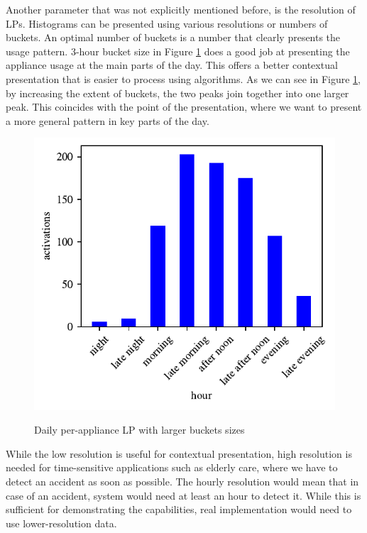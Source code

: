 Another parameter that was not explicitly mentioned before, is the resolution of LPs. 
Histograms can be presented using various resolutions or numbers of buckets.
An optimal number of buckets is a number that clearly presents the usage pattern. 
3-hour bucket size in Figure \ref{fig:4hours} does a good job at presenting the appliance usage at the main parts of the day.
This offers a better contextual presentation that is easier to process using algorithms.
As we can see in Figure \ref{fig:4hours}, by increasing the extent of buckets, the two peaks join together into one larger peak.
This coincides with the point of the presentation, where we want to present a more general pattern in key parts of the day.

\begin{figure}[H]
	\centering
	\caption{Daily per-appliance LP with larger buckets sizes}
	\includegraphics[]{../Figures/LPS/3_hours.pdf}
	\label{fig:4hours}
\end{figure}

While the low resolution is useful for contextual presentation,
high resolution is needed for time-sensitive applications such as elderly care,
where we have to detect an accident as soon as possible.
The hourly resolution would mean that in case of an accident, system would need at least an hour to detect it.
While this is sufficient for demonstrating the capabilities, real implementation would need to use lower-resolution data.

